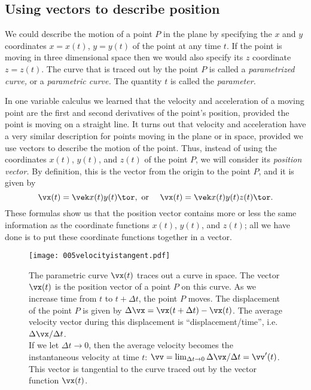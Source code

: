 \subsection{Using vectors to describe position} %
We could describe the motion of a point $P$ in the plane by specifying the $x$ and
$y$ coordinates $x=x(t)$, $y=y(t)$ of the point at any time $t$.  If the point is
moving in three dimensional space then we would also specify its $z$ coordinate
$z=z(t)$.  The curve that is traced out by the point $P$ is called a
\emph{parametrized curve,} or a \emph{parametric curve.}  The quantity $t$ is called
the \emph{parameter.}

In one variable calculus we learned that the velocity and acceleration of a moving
point are the first and second derivatives of the point's position, provided the
point is moving on a straight line.  It turns out that velocity and acceleration have
a very similar description for points moving in the plane or in space, provided we
use vectors to describe the motion of the point.   Thus, instead of using the
coordinates $x(t)$, $y(t)$, and $z(t)$ of the point $P$, we will consider its
\emph{position vector.}  By definition, this is the vector from the origin to the
point $P$, and it is given by
\[
\vx(t) = \vek x(t)\\ y(t)\tor, \text{ or }\quad \vx(t) = \vek x(t)\\
y(t) \\ z(t)\tor.
\]
These formulas show us that the position vector contains more or less the same
information as the coordinate functions $x(t)$, $y(t)$, and $z(t)$; all we have done
is to put these coordinate functions together in a vector.

\begin{figure}[t]
  \centering
  \texttt{[image: 005velocityistangent.pdf]}
  \caption{The parametric curve $\vx(t)$ traces out a curve in space.  The vector
    $\vx(t)$ is the position vector of a point $P$ on this curve.  As we increase
    time from $t$ to $ t+\Delta t$, the point $P$ moves.  The displacement of the
    point $P$ is given by $\Delta\vx = \vx(t+\Delta t) - \vx(t)$.  The average
    velocity vector during
    this displacement is ``displacement/time'', i.e.\ $\Delta \vx/\Delta t$.\\
    \null\qquad If we let $\Delta t\to 0$, then the average velocity becomes the
    instantaneous velocity at time $t$: $\vv = \lim_{\Delta t\to0}\Delta\vx/\Delta t
    = \vv'(t)$.  This vector is tangential to the curve traced out by the vector
    function $\vx(t)$. }
  \label{fig:05velocity-is-deriv-of-position}
\end{figure}
